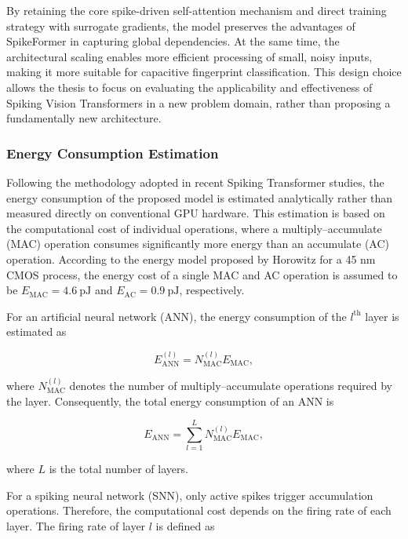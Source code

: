 \documentclass[../main.tex]{subfiles}
\begin{document}
By retaining the core spike-driven self-attention mechanism and direct training strategy with surrogate gradients, the model preserves the advantages of SpikeFormer in capturing global dependencies. At the same time, the architectural scaling enables more efficient processing of small, noisy inputs, making it more suitable for capacitive fingerprint classification. This design choice allows the thesis to focus on evaluating the applicability and effectiveness of Spiking Vision Transformers in a new problem domain, rather than proposing a fundamentally new architecture.

\subsubsection{Energy Consumption Estimation}
\label{sec:energy_estimation}

Following the methodology adopted in recent Spiking Transformer \cite{zhou2023spikeformer} studies, the
energy consumption of the proposed model is estimated analytically rather than
measured directly on conventional GPU hardware. This estimation is based on the
computational cost of individual operations, where a multiply--accumulate (MAC)
operation consumes significantly more energy than an accumulate (AC) operation.
According to the energy model proposed by Horowitz \cite{horowitz20141} for a 45 nm CMOS process, the
energy cost of a single MAC and AC operation is assumed to be
$E_{\mathrm{MAC}} = 4.6~\mathrm{pJ}$ and
$E_{\mathrm{AC}} = 0.9~\mathrm{pJ}$, respectively.

For an artificial neural network (ANN), the energy consumption of the
$l^{\mathrm{th}}$ layer is estimated as

\begin{equation}
E_{\mathrm{ANN}}^{(l)}
=
N_{\mathrm{MAC}}^{(l)}
E_{\mathrm{MAC}},
\end{equation}

where $N_{\mathrm{MAC}}^{(l)}$ denotes the number of multiply--accumulate
operations required by the layer. Consequently, the total energy consumption of
an ANN is

\begin{equation}
E_{\mathrm{ANN}}
=
\sum_{l=1}^{L}
N_{\mathrm{MAC}}^{(l)}
E_{\mathrm{MAC}},
\end{equation}

where $L$ is the total number of layers.

For a spiking neural network (SNN), only active spikes trigger accumulation
operations. Therefore, the computational cost depends on the firing rate of each
layer. The firing rate of layer $l$ is defined as
\end{document}
